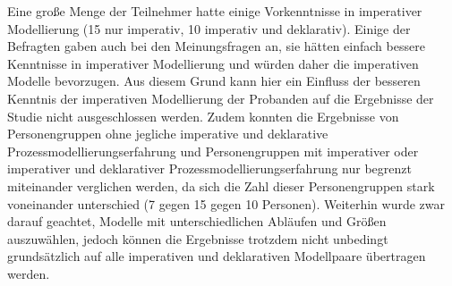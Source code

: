 Eine große Menge der Teilnehmer hatte einige Vorkenntnisse in imperativer Modellierung (15 nur imperativ, 10 imperativ und deklarativ). Einige der Befragten gaben auch bei den Meinungsfragen an, sie hätten einfach bessere Kenntnisse in imperativer Modellierung und würden daher die imperativen Modelle bevorzugen. Aus diesem Grund kann hier ein Einfluss der besseren Kenntnis der imperativen Modellierung der Probanden auf die Ergebnisse der Studie nicht ausgeschlossen werden. \newline 
Zudem konnten die Ergebnisse von Personengruppen ohne jegliche imperative und deklarative Prozessmodellierungserfahrung und Personengruppen mit imperativer oder imperativer und deklarativer Prozessmodellierungserfahrung nur begrenzt miteinander verglichen werden, da sich die Zahl dieser Personengruppen stark voneinander unterschied (7 gegen 15 gegen 10 Personen).\newline
Weiterhin wurde zwar darauf geachtet, Modelle mit unterschiedlichen Abläufen und Größen auszuwählen, jedoch können die Ergebnisse trotzdem nicht unbedingt grundsätzlich auf alle imperativen und deklarativen Modellpaare übertragen werden. \newline

 











